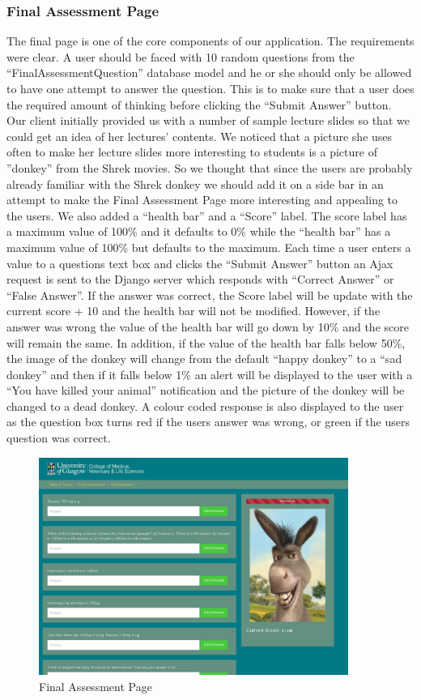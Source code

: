 \documentclass{l3proj}
\begin{document}
{\subsubsection{Final Assessment Page}
The final page is one of the core components of our application. The
requirements were clear. A user should be faced with 10 random
questions from the “FinalAssessmentQuestion” database model and he or
she should only be allowed to have one attempt to answer the
question. This is to make sure that a user does the required amount of
thinking before clicking the “Submit Answer” button. Our client
initially provided us with a number of sample lecture slides so that
we could get an idea of her lectures’ contents. We noticed that a
picture she uses often to make her lecture slides more interesting to
students is a picture of ''donkey'' from the Shrek movies. So we
thought that since the users are probably already familiar with the
Shrek donkey  we should add it on a side bar in an attempt to make the Final Assessment Page more interesting and appealing to the users. We also added a “health bar” and a “Score” label. The score label has a maximum value of 100\% and it defaults to 0\% while the “health bar” has a maximum value of 100\% but defaults to the maximum. Each time a user enters a value to a questions text box and clicks the “Submit Answer” button an Ajax request is sent to the Django server which responds with “Correct Answer” or “False Answer”. If the answer was correct, the Score label will be update with the current score + 10 and the health bar will not be modified. However, if the answer was wrong the value of the health bar will go down by 10\% and the score will remain the same.  In addition, if the value of the health bar falls below 50\%, the image of the donkey will change from the default “happy donkey” to a “sad donkey” and then if it falls below 1\% an alert will be displayed to the user with a “You have killed your animal” notification and the picture of the donkey will be changed to a dead donkey.  A colour coded response is also displayed to the user as the question box turns red if the users answer was wrong, or green if the users question was correct. 
\begin{figure}[!htb]
\caption{Final Assessment Page}
 \centering
\includegraphics[width=0.9\textwidth]{images/finalAssessmentPage.png}
\end{figure}
}
\end{document}

